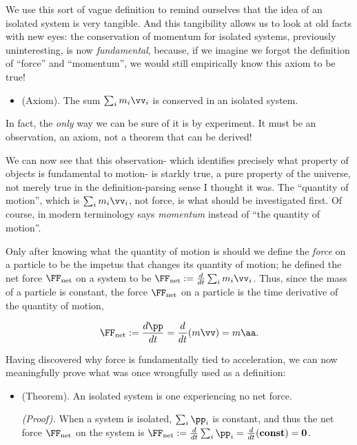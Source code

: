 \documentclass{article}
\begin{document}
We use this sort of vague definition to remind ourselves that the idea of an isolated system is very tangible. And this tangibility allows us to look at old facts with new eyes: the conservation of momentum for isolated systems, previously uninteresting, is now \textit{fundamental}, because, if we imagine we forgot the definition of ``force'' and ``momentum'', we would still empirically know this axiom to be true!

\begin{itemize}
    \item (Axiom). The sum $\sum_i m_i \vv_i$ is conserved in an isolated system.
\end{itemize}

In fact, the \textit{only} way we can be sure of it is by experiment. It must be an observation, an axiom, not a theorem that can be derived!

We can now see that this observation- which identifies precisely what property of objects is fundamental to motion- is starkly true, a pure property of the universe, not merely true in the definition-parsing sense I thought it was. The ``quantity of motion'', which is $\sum_i m_i \vv_i$, not force, is what should be investigated first. Of course, in modern terminology says \textit{momentum} instead of ``the quantity of motion''.

Only after knowing what the quantity of motion is should we define the \textit{force} on a particle to be the impetus that changes its quantity of motion; he defined the net force $\FF_{\text{net}}$ on a system to be $\FF_{\text{net}} := \frac{d}{dt} \sum_i m_i \vv_i$. Thus, since the mass of a particle is constant, the force $\FF_{\text{net}}$ on a particle is the time derivative of the quantity of motion,

\begin{align*}
    \FF_{\text{net}} := \frac{d\pp}{dt} = \frac{d}{dt}(m\vv) = m\aa.
\end{align*}

Having discovered why force is fundamentally tied to acceleration, we can now meaningfully prove what was once wrongfully used as a definition:

\begin{itemize}
    \item (Theorem). An isolated system is one experiencing no net force.
    
    \indent \textit{(Proof).} When a system is isolated, $\sum_i \pp_i$ is constant, and thus the net force $\FF_{\text{net}}$ on the system is $\FF_{\text{net}} := \frac{d}{dt}\sum_i \pp_i = \frac{d}{dt}(\textbf{const}) = \mathbf{0}$.
\end{itemize}
\end{document}
